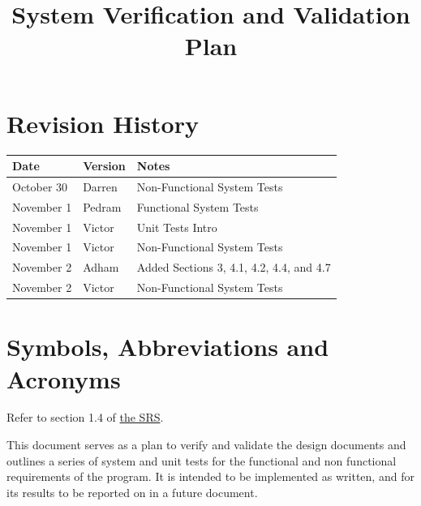 \documentclass[12pt, titlepage]{article}
\begin{document}
\title{System Verification and Validation Plan\\\progname} 
\author{\authname}
	
\maketitle


\section{Revision History}

\begin{tabularx}{\textwidth}{p{3cm}p{2cm}X}
\toprule {\bf Date} & {\bf Version} & {\bf Notes}\\
\midrule
October 30 & Darren & Non-Functional System Tests\\
November 1 & Pedram & Functional System Tests\\
November 1 & Victor & Unit Tests Intro\\
November 1 & Victor & Non-Functional System Tests\\
November 2 & Adham & Added Sections 3, 4.1, 4.2, 4.4, and 4.7\\
November 2 & Victor & Non-Functional System Tests\\
\bottomrule
\end{tabularx}

\newpage

\tableofcontents

\listoftables

\listoffigures

\newpage

\section{Symbols, Abbreviations and Acronyms}

Refer to section 1.4 of \href{https://github.com/agentvv/MTOBridge/blob/main/docs/SRS/SRS.pdf}{the SRS}.

\newpage


This document serves as a plan to verify and validate the design documents and outlines a series of system and unit tests for the functional and non functional requirements
of the program. It is intended to be implemented as written, and for its results to be reported on in a future document.
\end{document}
